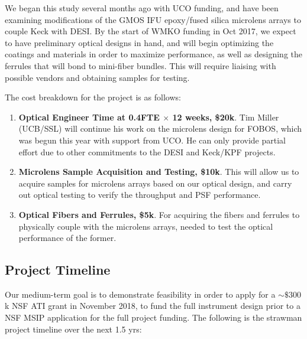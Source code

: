 \documentclass[10pt,letterpaper]{article}
\begin{document}
We began this study several months ago with UCO funding, and have been examining modifications of the 
GMOS IFU epoxy/fused silica microlens arrays to couple Keck with DESI. By the start of WMKO funding in Oct 2017, we expect
to have preliminary optical designs in hand, and will begin optimizing the coatings and materials in order to maximize performance, 
as well as designing the ferrules that will bond to mini-fiber bundles.
This will require liaising with possible vendors and obtaining samples for testing.

The cost breakdown for the project is as follows:

\begin{enumerate}[label=(\textit{\roman*})]
	\item {\bf Optical Engineer Time at 0.4FTE $\times$ 12 weeks, \$20k}. Tim Miller (UCB/SSL) will continue his work on the
	microlens design for FOBOS, which was begun this year with support from UCO. He can only provide partial effort due to 
	other commitments to the DESI and Keck/KPF projects.
	\item {\bf Microlens Sample Acquisition and Testing, \$10k}. This will allow us to acquire samples for microlens 
	arrays based on our optical design, and carry out optical testing to verify the throughput and PSF performance.
	\item {\bf Optical Fibers and Ferrules, \$5k}. For acquiring the fibers and ferrules to physically couple with the microlens arrays, 
	needed to test the optical performance of the former.
\end{enumerate}

\subsection*{Project Timeline}
Our medium-term goal is to demonstrate feasibility in order to apply for a $\sim\$300$k NSF ATI grant in November 2018, 
to fund the full instrument design prior
to a NSF MSIP application for the full project funding. The following is the strawman project timeline over the next 1.5 yrs:
\end{document}
